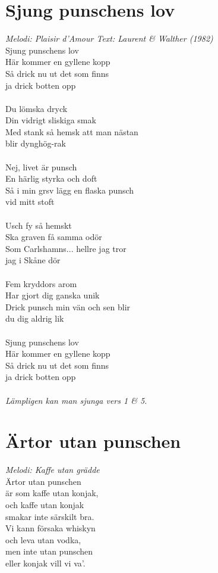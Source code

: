 \section{Sjung punschens lov}
\textit{Melodi: Plaisir d'Amour \hspace{5mm} Text: Laurent \& Walther (1982)}
\vspace{2mm}\\
Sjung punschens lov\\
Här kommer en gyllene kopp\\
Så drick nu ut det som finns\\
ja drick botten opp\\
\\
Du lömska dryck\\
Din vidrigt sliskiga smak\\
Med stank så hemsk att man nästan\\
blir dynghög-rak\\
\\
Nej, livet är punsch\\
En härlig styrka och doft\\
Så i min grsv lägg en flaska punsch\\
vid mitt stoft\\
\\
Usch fy så hemskt\\
Ska graven få samma odör\\
Som Carlshamns... hellre jag tror\\
jag i Skåne dör\\
\\
Fem kryddors arom\\
Har gjort dig ganska unik\\
Drick punsch min vän och sen blir\\
du dig aldrig lik\\
\\
Sjung punschens lov\\
Här kommer en gyllene kopp\\
Så drick nu ut det som finns\\
ja drick botten opp\\
\\
\textit{Lämpligen kan man sjunga vers 1 \& 5.}

\section{Ärtor utan punschen}
\textit{Melodi: Kaffe utan grädde}
\vspace{2mm}\\
Ärtor utan punschen\\
är som kaffe utan konjak,\\
och kaffe utan konjak\\
smakar inte särskilt bra.\\
Vi kann försaka whiskyn\\
och leva utan vodka,\\
men inte utan punschen\\
eller konjak vill vi va'.\\

